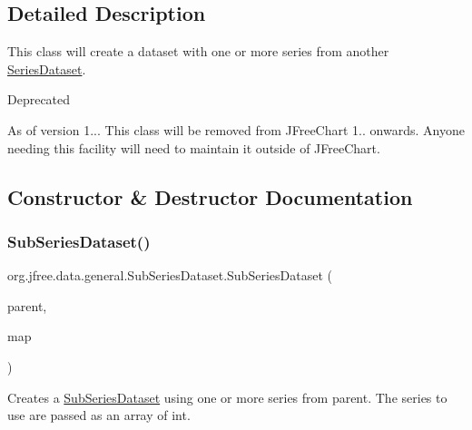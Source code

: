 \subsection{Detailed Description}
This class will create a dataset with one or more series from another \mbox{\hyperlink{interfaceorg_1_1jfree_1_1data_1_1general_1_1_series_dataset}{Series\+Dataset}}.

\begin{DoxyRefDesc}{Deprecated}
\item[\mbox{\hyperlink{deprecated__deprecated000262}{Deprecated}}]As of version 1... This class will be removed from J\+Free\+Chart 1.. onwards. Anyone needing this facility will need to maintain it outside of J\+Free\+Chart. \end{DoxyRefDesc}


\subsection{Constructor \& Destructor Documentation}
\mbox{\label{classorg_1_1jfree_1_1data_1_1general_1_1_sub_series_dataset_a2d88e8f334a75634b4f47c7fbcdb1f65}} 
\subsubsection{\texorpdfstring{Sub\+Series\+Dataset()}{SubSeriesDataset()}\hspace{0.1cm}{\footnotesize\ttfamily [1/2]}}
{\footnotesize\ttfamily org.\+jfree.\+data.\+general.\+Sub\+Series\+Dataset.\+Sub\+Series\+Dataset (\begin{DoxyParamCaption}\item[{\mbox{\hyperlink{interfaceorg_1_1jfree_1_1data_1_1general_1_1_series_dataset}{Series\+Dataset}}}]{parent,  }\item[{int \mbox{[}$\,$\mbox{]}}]{map }\end{DoxyParamCaption})}

Creates a \mbox{\hyperlink{classorg_1_1jfree_1_1data_1_1general_1_1_sub_series_dataset}{Sub\+Series\+Dataset}} using one or more series from {\ttfamily parent}. The series to use are passed as an array of int.


